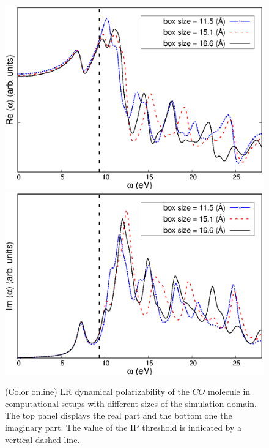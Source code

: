 \documentclass[reprint,aps,prb]{revtex4-1}
\begin{document}
\begin{figure}
\centering
\subfloat
{\includegraphics[scale=0.56]{Fig2a_CO_AlphaOmegaReal.eps}} \\
\centering
\subfloat
{\includegraphics[scale=0.58]{Fig2b_CO_spectrum.eps}}
\caption{\label{co_spectrum}(Color online) LR dynamical polarizability of the $CO$ molecule in computational setups with different
sizes of the simulation domain. The top panel displays the real part and the bottom one the imaginary part. The value of the IP threshold
is indicated by a vertical dashed line.}
\end{figure}

\end{document}
